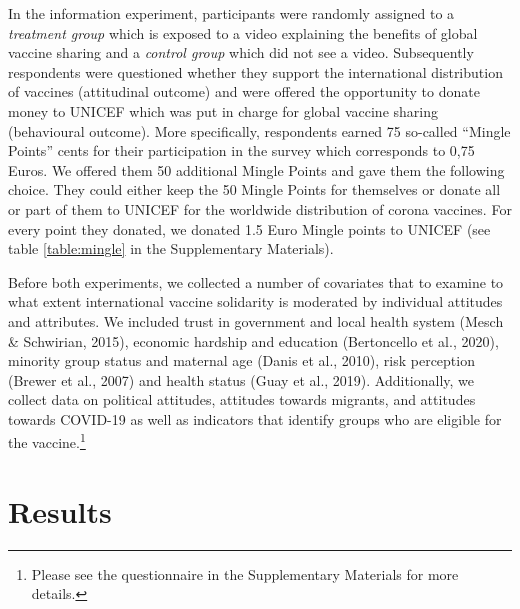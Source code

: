 \documentclass[12pt,oneside,smallheadings,chapterprefix=true]{article}
\begin{document}
In the information experiment, participants were randomly assigned to a \emph{treatment group} which is exposed to a video explaining the benefits of global vaccine sharing and a \emph{control group} which did not see a video. Subsequently respondents were questioned whether they support the international distribution of vaccines (attitudinal outcome) and were offered the opportunity to donate money to UNICEF which was put in charge for global vaccine sharing (behavioural outcome). More specifically, respondents earned 75 so-called "`Mingle Points"' cents for their participation in the survey which corresponds to 0,75 Euros. We offered them  50 additional Mingle Points and gave them the following choice. They could either keep the 50 Mingle Points for themselves  or donate all or part of them to UNICEF for the worldwide distribution of corona vaccines. For every point they donated, we donated 1.5 Euro Mingle points to UNICEF (see table \ref{table:mingle} in the Supplementary Materials).


Before both experiments, we collected a number of covariates that to examine to what extent international vaccine solidarity is moderated by individual attitudes and attributes. We included trust in government and local health system (Mesch
\& Schwirian, 2015), economic hardship and education (Bertoncello et al.,
2020), minority group status and maternal age (Danis et al., 2010), risk
perception (Brewer et al., 2007) and health status (Guay et al., 2019).
Additionally, we collect data on political attitudes, attitudes towards
migrants, and attitudes towards COVID-19 as well as indicators that
identify groups who are eligible for the vaccine.\footnote{Please see the
questionnaire in the Supplementary Materials for more details.}



\section*{Results}
\label{sec:results}
\end{document}
